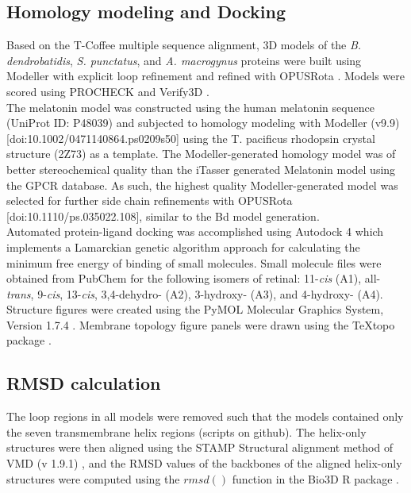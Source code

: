 \subsection{Homology modeling and Docking}
\label{subsec:meth_modeling_docking}
Based on the T-Coffee multiple sequence alignment, 3D models of the \textit{B. dendrobatidis}, \textit{S. punctatus}, and \textit{A. macrogynus} proteins were built using Modeller \cite{Eswar2007} with explicit loop refinement and refined with OPUSRota \cite{Lu2008}. Models were scored using PROCHECK \cite{Laskowski1993,Wiederstein2007} and Verify3D \cite{Luthy1992}.\\
\indent The melatonin model was constructed using the human melatonin sequence (UniProt ID: P48039) and subjected to homology modeling with Modeller (v9.9) [doi:10.1002/0471140864.ps0209s50] using the T. pacificus rhodopsin crystal structure (2Z73) as a template. The Modeller-generated homology model was of better stereochemical quality than the iTasser generated Melatonin model using the GPCR database. As such, the highest quality Modeller-generated model was selected for further side chain refinements with OPUSRota [doi:10.1110/ps.035022.108], similar to the Bd model generation.\\
\indent Automated protein-ligand docking was accomplished using Autodock 4 \cite{Morris2009} which implements a Lamarckian genetic algorithm approach for calculating the minimum free energy of binding of small molecules. Small molecule files were obtained from PubChem \cite{Bolton2008} for the following isomers of retinal: 11-\textit{cis} (A1), all-\textit{trans}, 9-\textit{cis}, 13-\textit{cis}, 3,4-dehydro- (A2), 3-hydroxy- (A3), and 4-hydroxy- (A4).\\
\indent Structure figures were created using the PyMOL Molecular Graphics System, Version 1.7.4 \cite{PyMOL}. Membrane topology figure panels were drawn using the {\TeX}topo package \cite{Beitz2000}.\\
\subsection{RMSD calculation}
The loop regions in all models were removed such that the models contained only the seven transmembrane helix regions (scripts on github). The helix-only structures were then aligned using the STAMP Structural alignment method \cite{Russell2004} of VMD (v 1.9.1) \cite{Humphrey1996}, and the RMSD values of the backbones of the aligned helix-only structures were computed using the $rmsd()$ function in the Bio3D R package \cite{Grant2006}.\\
